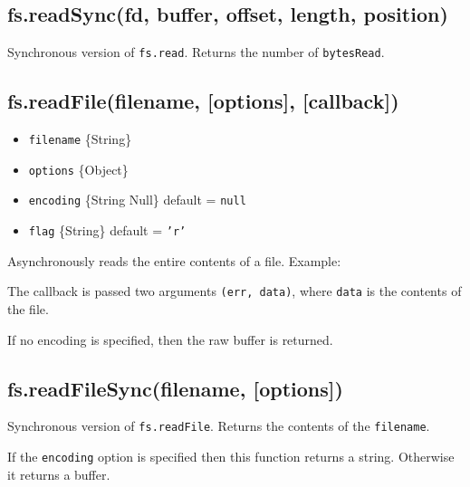 \subsection{fs.readSync(fd, buffer, offset, length, position)}

Synchronous version of \texttt{fs.read}. Returns the number of
\texttt{bytesRead}.

\subsection{fs.readFile(filename, {[}options{]}, {[}callback{]})}

\begin{itemize}
\item
  \texttt{filename} \{String\}
\item
  \texttt{options} \{Object\}
\item
  \texttt{encoding} \{String \textbar{} Null\} default = \texttt{null}
\item
  \texttt{flag} \{String\} default = \texttt{'r'}
\end{itemize}

Asynchronously reads the entire contents of a file. Example:

\begin{Shaded}
\begin{Highlighting}[]
\NormalTok{(}\NormalTok{, } 
    
\NormalTok{\});}
\end{Highlighting}
\end{Shaded}

The callback is passed two arguments \texttt{(err, data)}, where
\texttt{data} is the contents of the file.

If no encoding is specified, then the raw buffer is returned.

\subsection{fs.readFileSync(filename, {[}options{]})}

Synchronous version of \texttt{fs.readFile}. Returns the contents of the
\texttt{filename}.

If the \texttt{encoding} option is specified then this function returns
a string. Otherwise it returns a buffer.

